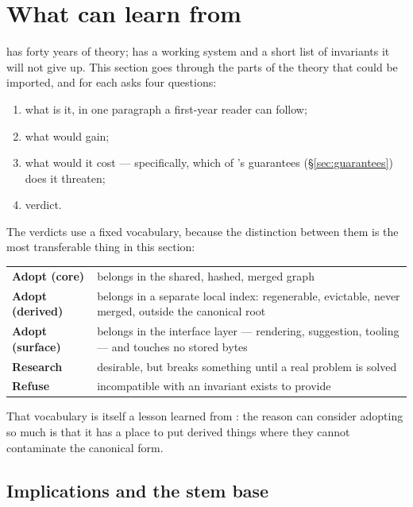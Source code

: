\section{What \odag{} can learn from \fca{}}
\label{sec:learn}

\fca{} has forty years of theory; \odag{} has a working system and a short
list of invariants it will not give up. This section goes through the parts of
the theory that could be imported, and for each asks four questions:

\begin{enumerate}[label=(\alph*),leftmargin=2.0em,itemsep=1pt]
\item what is it, in one paragraph a first-year reader can follow;
\item what would \odag{} gain;
\item what would it cost --- specifically, which of \odag{}'s guarantees
  (\S\ref{sec:guarantees}) does it threaten;
\item verdict.
\end{enumerate}

The verdicts use a fixed vocabulary, because the distinction between them is
the most transferable thing in this section:

\begin{center}\small
\begin{tabularx}{0.94\textwidth}{@{}lX@{}}
\toprule
\textbf{Adopt (core)} & belongs in the shared, hashed, merged graph\\
\textbf{Adopt (derived)} & belongs in a separate local index: regenerable,
  evictable, never merged, outside the canonical root\\
\textbf{Adopt (surface)} & belongs in the interface layer --- rendering,
  suggestion, tooling --- and touches no stored bytes\\
\textbf{Research} & desirable, but breaks something until a real problem is
  solved\\
\textbf{Refuse} & incompatible with an invariant \odag{} exists to provide\\
\bottomrule
\end{tabularx}
\end{center}

That vocabulary is itself a lesson learned from \fca{}: the reason \odag{} can
consider adopting so much is that it has a place to put derived things where
they cannot contaminate the canonical form.

\subsection{Implications and the stem base}
\label{sec:learn-implications}

